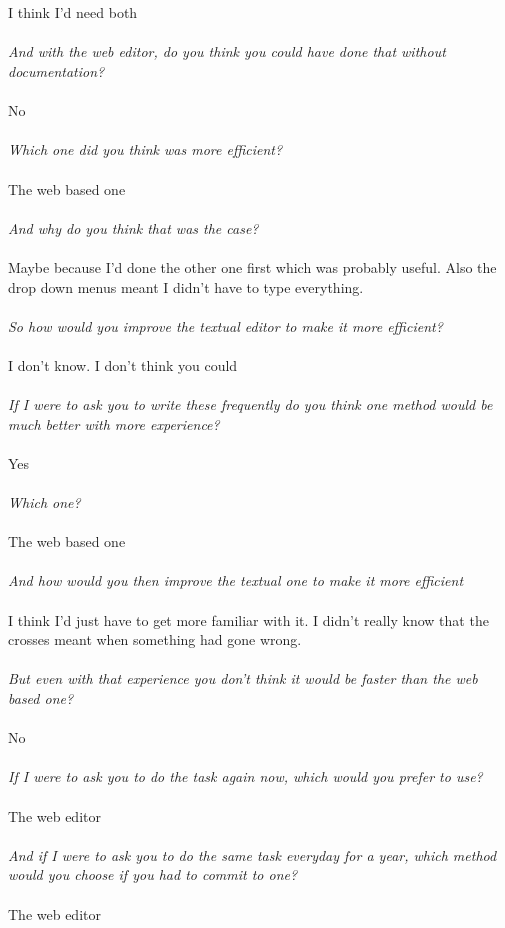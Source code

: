 \documentclass{report}
\begin{document}
\\
\\
I think I'd need both
\\
\\
\textit{And with the web editor, do you think you could have done that without documentation?}
\\
\\
No
\\
\\
\textit{Which one did you think was more efficient?}
\\
\\
The web based one
\\
\\
\textit{And why do you think that was the case?}
\\
\\
Maybe because I'd done the other one first which was probably useful. Also the drop down menus meant I didn't have to type everything.
\\
\\
\textit{So how would you improve the textual editor to make it more efficient?}
\\
\\
I don't know. I don't think you could
\\
\\
\textit{If I were to ask you to write these frequently do you think one method would be much better with more experience?}
\\
\\
Yes
\\
\\
\textit{Which one?}
\\
\\
The web based one
\\
\\
\textit{And how would you then improve the textual one to make it more efficient}
\\
\\
I think I'd just have to get more familiar with it. I didn't really know that the crosses meant when something had gone wrong.
\\
\\
\textit{But even with that experience you don't think it would be faster than the web based one?}
\\
\\
No
\\
\\
\textit{If I were to ask you to do the task again now, which would you prefer to use?}
\\
\\
The web editor
\\
\\
\textit{And if I were to ask you to do the same task everyday for a year, which method would you choose if you had to commit to one?}
\\
\\
The web editor
\end{document}
